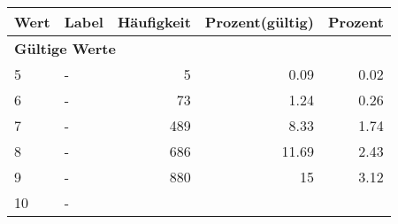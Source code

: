     \begin{longtable}{lXrrr}
     \toprule
     \textbf{Wert} & \textbf{Label} & \textbf{Häufigkeit} & \textbf{Prozent(gültig)} & \textbf{Prozent} \\
     \endhead
     \midrule
     \multicolumn{5}{l}{\textbf{Gültige Werte}}\\

     5 &
     \multicolumn{1}{X}{ -  } &


       \num{5} &
       \num[round-mode=places,round-precision=2]{0,09} &
         \num[round-mode=places,round-precision=2]{0,02} \\

     6 &
     \multicolumn{1}{X}{ -  } &


       \num{73} &
       \num[round-mode=places,round-precision=2]{1,24} &
         \num[round-mode=places,round-precision=2]{0,26} \\

     7 &
     \multicolumn{1}{X}{ -  } &


       \num{489} &
       \num[round-mode=places,round-precision=2]{8,33} &
         \num[round-mode=places,round-precision=2]{1,74} \\

     8 &
     \multicolumn{1}{X}{ -  } &


       \num{686} &
       \num[round-mode=places,round-precision=2]{11,69} &
         \num[round-mode=places,round-precision=2]{2,43} \\

     9 &
     \multicolumn{1}{X}{ -  } &


       \num{880} &
       \num[round-mode=places,round-precision=2]{15} &
         \num[round-mode=places,round-precision=2]{3,12} \\

     10 &
     \multicolumn{1}{X}{ -  } &



\end{longtable}
